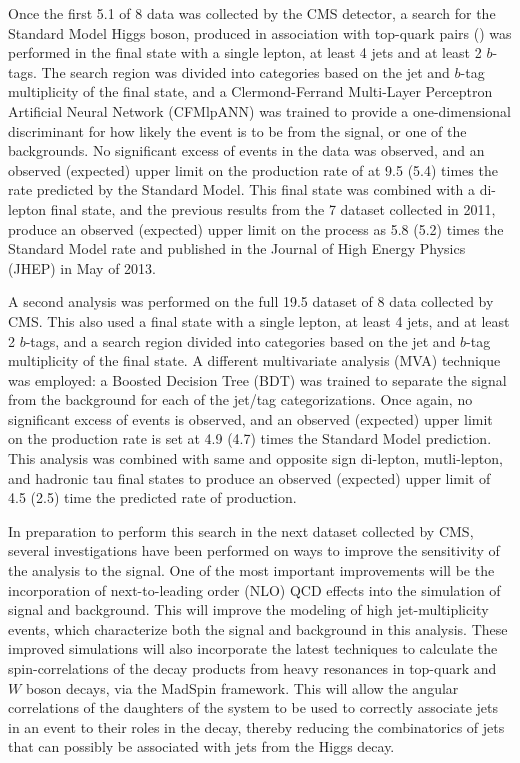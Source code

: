 \par Once the first 5.1 \fbinv of 8 \TeV data was collected by the CMS
detector, a search for the Standard Model Higgs boson, produced in
association with top-quark pairs (\ttH) was performed in the final
state with a single lepton, at least 4 jets and at least 2 $b$-tags.
The search region was divided into categories based on the jet and
$b$-tag multiplicity of the final state, and a Clermond-Ferrand
Multi-Layer Perceptron Artificial Neural Network (CFMlpANN) was
trained to provide a one-dimensional discriminant for how likely the
event is to be from the \ttH signal, or one of the \ttjets
backgrounds.  No significant excess of events in the data was
observed, and an observed (expected) upper limit on the production
rate of \ttH at 9.5 (5.4) times the rate predicted by the Standard
Model.  This final state was combined with a di-lepton final state,
and the previous results from the 7 \TeV dataset collected in 2011,
produce an observed (expected) upper limit on the \ttH process as 5.8
(5.2) times the Standard Model rate and published in the Journal of
High Energy Physics (JHEP) in May of 2013.   

\par A second analysis was performed on the full 19.5 \fbinv dataset of
8 \TeV data collected by CMS.  This also used a final state with a
single lepton, at least 4 jets, and at least 2 $b$-tags, and a search
region divided into categories based on the jet and $b$-tag
multiplicity of the final state.  A different multivariate analysis
(MVA) technique was employed: a Boosted Decision Tree (BDT) was
trained to separate the \ttH signal from the \ttjets background for
each of the jet/tag categorizations.  Once again, no significant
excess of events is observed, and an observed (expected) upper limit
on the \ttH production rate is set at 4.9 (4.7) times the Standard
Model prediction.  This analysis was combined with same and opposite
sign di-lepton, mutli-lepton, and hadronic tau final states to produce
an observed (expected) upper limit of 4.5 (2.5) time the predicted rate
of \ttH production.  

\par In preparation to perform this search in the next dataset
collected by CMS, several investigations have been performed on ways
to improve the sensitivity of the analysis to the \ttH signal.  One of
the most important improvements will be the incorporation of
next-to-leading order (NLO) QCD effects into the simulation of \ttH
signal and \ttjets background.  This will improve the modeling of high
jet-multiplicity events, which characterize both the signal and
background in this analysis.  These improved simulations will also
incorporate the latest techniques to calculate the spin-correlations
of the decay products from heavy resonances in top-quark and $W$ boson
decays, via the MadSpin framework.  This will allow the angular
correlations of the daughters of the \ttbar system to be used to
correctly associate jets in an event to their roles in the \ttbar
decay, thereby reducing the combinatorics of jets that can possibly be
associated with jets from the Higgs decay.  

